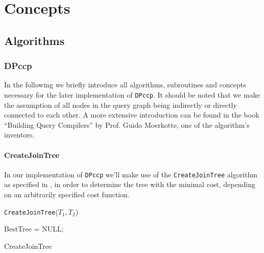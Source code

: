 \section{Concepts}

\subsection{Algorithms}

\subsubsection{DPccp}

In the following we briefly introduce all algorithms, subroutines and concepts necessary for the later implementation of \texttt{DPccp}. It should be noted that we make the assumption of all nodes in the query graph being indirectly or directly connected to each other. A more extensive introduction can be found in the book ``Building Query Compilers''\cite{moerkotte2009building} by Prof. Guido Moerkotte, one of the algorithm's inventors.

\paragraph{CreateJoinTree} In our implementation of \texttt{DPccp} we'll make use of the \texttt{CreateJoinTree} algorithm as specified in \cite{moerkotte2009building}, in order to determine the tree with the minimal cost, depending on an arbitrarily specified cost function.
\vspace{0.4cm}

\texttt{CreateJoinTree}($T_1, T_2$)

\begin{algorithm}[H]
\BlankLine
BestTree = NULL;\\
\vspace{0.5cm}
\caption{CreateJoinTree}
\end{algorithm}


